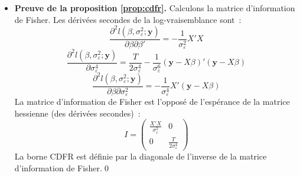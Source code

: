\documentclass[10pt]{beamer}
\theoremstyle{plain}
\begin{document}
\begin{notes}

  \begin{itemize}

  \item \textbf{Preuve de la proposition \ref{prop:cdfr}.} Calculons la matrice d'information de Fisher. Les dérivées secondes de la log-vraisemblance sont~:
    \[
      \frac{\partial^2 l(\beta, \sigma_{\varepsilon}^2; \mathbf y)}{\partial\beta\partial\beta'} = -\frac{1}{\sigma_{\varepsilon}^2}X'X
    \]
    \[
      \frac{\partial^2 l(\beta, \sigma_{\varepsilon}^2; \mathbf y)}{\partial\sigma_{\varepsilon}^4} = \frac{T}{2\sigma_{\varepsilon}^4}-\frac{1}{\sigma_{\varepsilon}^6}\left( \mathbf y-X\beta \right)'\left( \mathbf y-X\beta \right)
    \]
    \[
      \frac{\partial^2 l(\beta, \sigma_{\varepsilon}^2; \mathbf y)}{\partial\beta\partial\sigma_{\varepsilon}^2} = -\frac{1}{\sigma_{\varepsilon}^4}X'\left( \mathbf y - X\beta \right)
    \]
    La matrice d'information de Fisher est l'opposé de l'espérance de la matrice hessienne (des dérivées secondes)~:
    \[
      I =
      \begin{pmatrix}
        \frac{X'X}{\sigma_{\varepsilon}^2} & 0 \\
        0                                  & \frac{T}{2\sigma_{\varepsilon}^4}
      \end{pmatrix}
    \]
    La borne CDFR est définie par la diagonale de l'inverse de la matrice d'information de Fisher.\qed

  \end{itemize}

\end{notes}
\end{document}
